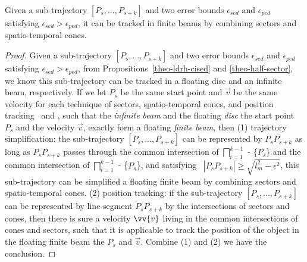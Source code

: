 
\begin{proposition}
	\label{theo-binary}
	Given a sub-trajectory $[P_s,...,P_{s+k}]$ and two error bounds $\epsilon_{sed}$ and $\epsilon_{ped}$ satisfying $\epsilon_{sed} > \epsilon_{ped}$, it can be tracked in finite beams by combining sectors and spatio-temporal cones.
\end{proposition}

\begin{proof}
Given a sub-trajectory $[P_s,...,P_{s+k}]$ and two error bounds $\epsilon_{sed}$ and $\epsilon_{ped}$ satisfying $\epsilon_{sed} > \epsilon_{ped}$, from Propositions~\ref{theo-ldrh-cised} and \ref{theo-half-sector}, we know this sub-trajectory can be tracked in a floating disc and an infinite beam, respectively.  
%
If we let $P_s$ be the same start point and $\vec{v}$ be the same velocity for each technique of sectors, spatio-temporal cones, and position tracking \wrt~\ped and \sed, such that the \emph{infinite beam} and the floating \emph{disc} \wrt the start point $P_s$ and the velocity $\vec{v}$, exactly form a floating \emph{finite beam}, then
(1) trajectory simplification: the sub-trajectory $[P_s,...,P_{s+k}]$ can be represented by $\overline{P_sP_{s+k}}$ as long as $\overline{P_sP_{s+k}}$ passes through the common intersection of $\bigsqcap_{i=1}^{k-1}$ - \{$P_s$\} and the common intersection of $\bigsqcap_{i=1}^{k-1}$ - \{$P_s$\}, and satisfying~ $|P_sP_{s+k}| \ge \sqrt{l_{m}^2 - \epsilon^2}$,
\ie this sub-trajectory can be simplified \wrt a floating finite beam by combining sectors and spatio-temporal cones.
(2) position tracking: if the sub-trajectory $[P_s,...,P_{s+k}]$ can be represented by line segment $\overline{P_sP_{s+k}}$ by the intersections of sectors and cones, then there is sure a velocity $\vv{v}$ living in the common intersections of cones and sectors, such that it is applicable to track the position of the object in the floating finite beam \wrt the $P_s$ and $\vec{v}$. 
Combine (1) and (2) we have the conclusion.
\end{proof}

